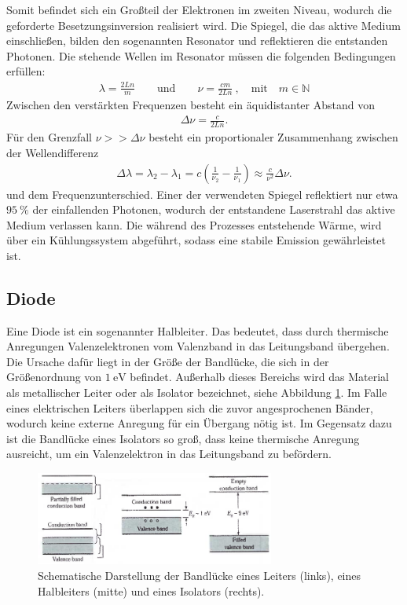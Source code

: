 Somit befindet sich ein Großteil der Elektronen im zweiten Niveau, wodurch die geforderte Besetzungsinversion realisiert wird. Die Spiegel, die das aktive Medium einschließen, bilden den sogenannten Resonator und reflektieren die entstanden Photonen. Die stehende Wellen im Resonator müssen die folgenden Bedingungen erfüllen:
\begin{align}
	\lambda=\frac{2Ln}{m}\qquad \text{und} \qquad\nu=\frac{cm}{2Ln}\:, \quad \text{mit}  \quad m \in \mathbb{N} 
\end{align}
Zwischen den verstärkten Frequenzen besteht ein äquidistanter Abstand von
\begin{align}
	\Delta \nu=\frac{c}{2Ln}.
\end{align}
Für den Grenzfall $\nu >>\Delta\nu$ besteht ein proportionaler Zusammenhang zwischen der Wellendifferenz
\begin{align}
	\Delta \lambda =\lambda_2- \lambda_1=c\left(\frac{1}{\nu_2}-\frac{1}{\nu_1}\right) \approx \frac{c}{\nu^2}\Delta\nu.
	\label{eq:1}
\end{align}
und dem Frequenzunterschied. Einer der verwendeten Spiegel reflektiert nur etwa $\SI{95}{\percent}$ der einfallenden Photonen, wodurch der entstandene Laserstrahl das aktive Medium verlassen kann. Die während des Prozesses entstehende Wärme, wird über ein Kühlungssystem abgeführt, sodass eine stabile Emission gewährleistet ist.

\subsection{Diode}
\label{sec:diode}

Eine Diode ist ein sogenannter Halbleiter. Das bedeutet, dass durch thermische Anregungen Valenzelektronen vom Valenzband in das Leitungsband übergehen. Die Ursache dafür liegt in der Größe der Bandlücke, die sich in der Größenordnung von $\SI{1}{\electronvolt}$ \cite{SZE} befindet. Außerhalb dieses Bereichs wird das Material als metallischer Leiter oder als Isolator bezeichnet, siehe Abbildung \ref{sze2}. Im Falle eines elektrischen Leiters überlappen sich die zuvor angesprochenen Bänder, wodurch keine externe Anregung für ein Übergang nötig ist. Im Gegensatz dazu ist die Bandlücke eines Isolators so groß, dass keine thermische Anregung ausreicht, um ein Valenzelektron in das Leitungsband zu befördern. 

\begin{figure}[H]
\centering
\includegraphics[width=0.7\textwidth]{ressources/bandgap.png}
\caption{Schematische Darstellung der Bandlücke eines Leiters (links), eines Halbleiters (mitte) und eines Isolators (rechts). \cite{SZE}}
\label{sze2}
\end{figure}


